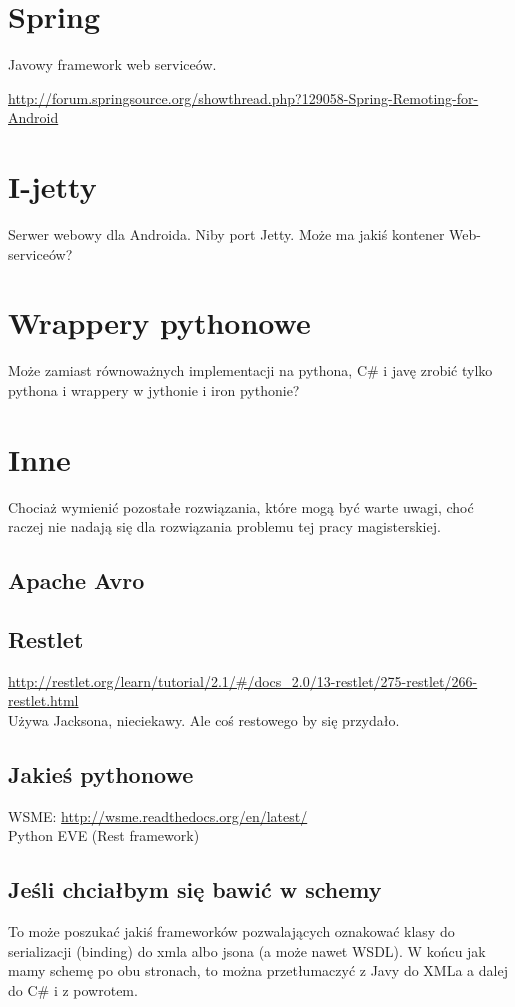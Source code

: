 \section{Spring}
Javowy framework web serviceów.

\url{http://forum.springsource.org/showthread.php?129058-Spring-Remoting-for-Android}\\


\section{I-jetty}
Serwer webowy dla Androida. Niby port Jetty. Może ma jakiś kontener Web-serviceów?

\section{Wrappery pythonowe}
Może zamiast równoważnych implementacji na pythona, C\# i javę zrobić tylko pythona i wrappery w jythonie i iron pythonie?


\section{Inne}
Chociaż wymienić pozostałe rozwiązania, które mogą być warte uwagi, choć raczej nie nadają się dla rozwiązania problemu tej pracy magisterskiej.

\subsection{Apache Avro}

\subsection{Restlet}
\url{http://restlet.org/learn/tutorial/2.1/#/docs_2.0/13-restlet/275-restlet/266-restlet.html}\\
Używa Jacksona, nieciekawy. Ale coś restowego by się przydało.

\subsection{Jakieś pythonowe}
WSME: \url{http://wsme.readthedocs.org/en/latest/}\\
Python EVE (Rest framework)\\

\subsection{Jeśli chciałbym się bawić w schemy}
To może poszukać jakiś frameworków pozwalających oznakować klasy do serializacji (binding) do xmla albo jsona (a może nawet WSDL).
W końcu jak mamy schemę po obu stronach, to można przetłumaczyć z Javy do XMLa a dalej do C\# i z powrotem.

